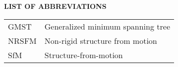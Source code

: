 
{}

\begin{center}
\textbf{LIST OF ABBREVIATIONS}
\vspace{16pt}
\end{center}

\noindent
\begin{tabular}{@{}p{0.8in} l}

GMST & Generalized minimum spanning tree \\
NRSFM & Non-rigid structure from motion \\
SfM & Structure-from-motion \\
\end{tabular}

\clearpage
